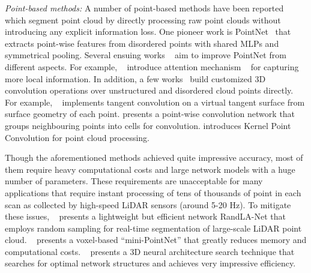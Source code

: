 \documentclass[preprint,review,3p]{elsarticle}
\begin{document}
\textit{Point-based methods:} A number of point-based methods have been reported which segment point cloud by directly processing raw point clouds without introducing any explicit information loss. One pioneer work is PointNet~\cite{qi2017pointnet} that extracts point-wise features from disordered points with shared MLPs and symmetrical pooling. Several ensuing works ~\cite{qi2017pointnet++,choy20194d,zhao2019pointweb,zhang2019shellnet} aim to improve PointNet from different aspects. For example, ~\cite{yang2019modeling,zhao2019pooling} introduce attention mechanism ~\cite{vaswani2017attention} for capturing more local information. In addition, a few works~\cite{tatarchenko2018tangent,hua2018pointwise,thomas2019kpconv} build customized 3D convolution operations over unstructured and disordered cloud points directly. For example, ~\cite{tatarchenko2018tangent} implements tangent convolution on a virtual tangent surface from surface geometry of each point. \cite{hua2018pointwise} presents a point-wise convolution network that groups neighbouring points into cells for convolution. \cite{thomas2019kpconv} introduces Kernel Point Convolution for point cloud processing. 

Though the aforementioned methods achieved quite impressive accuracy, most of them require heavy computational costs and large network models with a huge number of parameters. These requirements are unacceptable for many applications that require instant processing of tens of thousands of point in each scan as collected by high-speed LiDAR sensors (around 5-20 Hz). To mitigate these issues, ~\cite{hu2020randla} presents a lightweight but efficient network RandLA-Net that employs random sampling for real-time segmentation of large-scale LiDAR point cloud. ~\cite{zhang12356deep} presents a voxel-based “mini-PointNet” that greatly reduces memory and computational costs. ~\cite{tang2020searching} presents a 3D neural architecture search technique that searches for optimal network structures and achieves very impressive efficiency.
\end{document}
